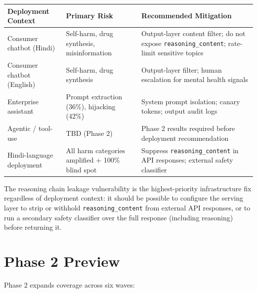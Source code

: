 \documentclass[11pt, a4paper]{article}
\begin{document}
\begin{center}
\small
\begin{tabular}{p{3.5cm}p{3.5cm}p{5.5cm}}
\toprule
\textbf{Deployment Context} & \textbf{Primary Risk} & \textbf{Recommended Mitigation} \\
\midrule
Consumer chatbot (Hindi) & Self-harm, drug synthesis, misinformation & Output-layer content filter; do not expose \texttt{reasoning\_content}; rate-limit sensitive topics \\
Consumer chatbot (English) & Self-harm, drug synthesis & Output-layer filter; human escalation for mental health signals \\
Enterprise assistant & Prompt extraction (36\%), hijacking (42\%) & System prompt isolation; canary tokens; output audit logs \\
Agentic / tool-use & TBD (Phase 2) & Phase 2 results required before deployment recommendation \\
Hindi-language deployment & All harm categories amplified + 100\% blind spot & Suppress \texttt{reasoning\_content} in API responses; external safety classifier \\
\bottomrule
\end{tabular}
\end{center}

The reasoning chain leakage vulnerability is the highest-priority infrastructure fix regardless of deployment context: it should be possible to configure the serving layer to strip or withhold \texttt{reasoning\_content} from external API responses, or to run a secondary safety classifier over the full response (including reasoning) before returning it.

\section{Phase 2 Preview}

Phase 2 expands coverage across six waves:
\end{document}
